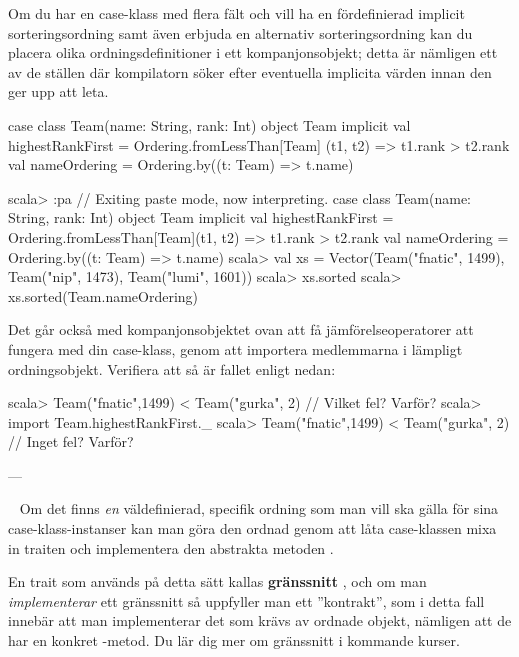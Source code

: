 \Subtask Om du har en case-klass med flera fält och vill ha en fördefinierad implicit sorteringsordning samt även erbjuda en alternativ sorteringsordning kan du placera olika ordningsdefinitioner i ett kompanjonsobjekt; detta är nämligen ett av de ställen där kompilatorn söker efter eventuella implicita värden innan den ger upp att leta.
\begin{Code}
case class Team(name: String, rank: Int)
object Team {
  implicit val highestRankFirst = Ordering.fromLessThan[Team]{
    (t1, t2) => t1.rank > t2.rank
  }
  val nameOrdering = Ordering.by((t: Team) => t.name)
}
\end{Code}
\begin{REPL}
scala> :pa
// Exiting paste mode, now interpreting.
case class Team(name: String, rank: Int)
object Team {
  implicit val highestRankFirst =
    Ordering.fromLessThan[Team]{(t1, t2) => t1.rank > t2.rank}
  val nameOrdering = Ordering.by((t: Team) => t.name)
}
scala> val xs =
         Vector(Team("fnatic", 1499), Team("nip", 1473), Team("lumi", 1601))
scala> xs.sorted
scala> xs.sorted(Team.nameOrdering)
\end{REPL}



\Subtask Det går också med kompanjonsobjektet ovan att få jämförelseoperatorer att fungera med din case-klass, genom att importera medlemmarna i lämpligt ordningsobjekt. Verifiera att så är fallet enligt nedan:
\begin{REPL}
scala> Team("fnatic",1499) < Team("gurka", 2)  // Vilket fel? Varför?
scala> import Team.highestRankFirst._
scala> Team("fnatic",1499) < Team("gurka", 2)  // Inget fel? Varför?
\end{REPL}


\SOLUTION


\TaskSolved \what ---

\QUESTEND







\QUESTBEGIN

\Task  \what~  Om det finns \emph{en} väldefinierad, specifik ordning som man vill ska gälla för sina case-klass-instanser kan man göra den ordnad genom att låta case-klassen mixa in traiten  och implementera den abstrakta metoden .

\begin{Background}
En trait som används på detta sätt kallas \textbf{gränssnitt} , och om man \emph{implementerar} ett gränssnitt så uppfyller man ett ''kontrakt'', som i detta fall innebär att man implementerar det som krävs av ordnade objekt, nämligen att de har en konkret -metod. Du lär dig mer om gränssnitt i kommande kurser.
\end{Background}

